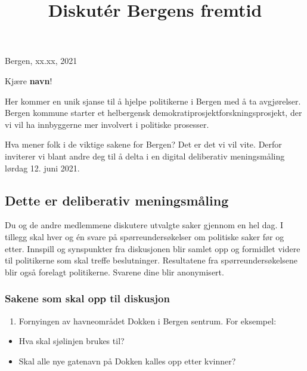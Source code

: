 \documentclass[
]{article}
\title{Diskutér Bergens fremtid}
\author{}
\date{\vspace{-2.5em}}
\providecommand{\tightlist}{%
  \setlength{\itemsep}{0pt}\setlength{\parskip}{0pt}}
\begin{document}
\maketitle

\begin{date}

Bergen, xx.xx, 2021

\end{date}

Kjære \textbf{navn}!

Her kommer en unik sjanse til å hjelpe politikerne i Bergen med å ta
avgjørelser. Bergen kommune starter et helbergensk
demokratiprosjektforskningsprosjekt, der vi vil ha innbyggerne mer
involvert i politiske prosesser.

Hva mener folk i de viktige sakene for Bergen? Det er det vi vil vite.
Derfor inviterer vi blant andre deg til å delta i en digital deliberativ
meningsmåling lørdag 12. juni 2021.

\hypertarget{dette-er-deliberativ-meningsmuxe5ling}{%
\subsection{Dette er deliberativ
meningsmåling}\label{dette-er-deliberativ-meningsmuxe5ling}}

Du og de andre medlemmene diskutere utvalgte saker gjennom en hel dag. I
tillegg skal hver og én svare på spørreundersøkelser om politiske saker
før og etter. Innspill og synspunkter fra diskusjonen blir samlet opp og
formidlet videre til politikerne som skal treffe beslutninger.
Resultatene fra spørreundersøkelsene blir også forelagt politikerne.
Svarene dine blir anonymisert.

\hypertarget{sakene-som-skal-opp-til-diskusjon}{%
\subsubsection{Sakene som skal opp til
diskusjon}\label{sakene-som-skal-opp-til-diskusjon}}

\begin{enumerate}
\def\labelenumi{\arabic{enumi}.}
\tightlist
\item
  Fornyingen av havneområdet Dokken i Bergen sentrum. For eksempel:
\end{enumerate}

\begin{itemize}
\item
  Hva skal sjølinjen brukes til?
\item
  Skal alle nye gatenavn på Dokken kalles opp etter kvinner?
\end{itemize}
\end{document}
